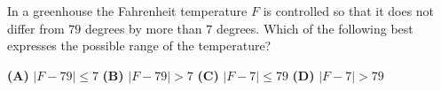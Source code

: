 In a greenhouse the Fahrenheit temperature $F$ is controlled so that it does not differ from $79$ degrees by more than $7$ degrees. Which of the following best expresses the possible range of the temperature?

\textbf{(A)} $|F-79|\le7$ \qquad \textbf{(B)} $|F-79|>7$ \qquad \textbf{(C)} $|F-7|\le79$ \qquad \textbf{(D)} $|F-7|>79$
